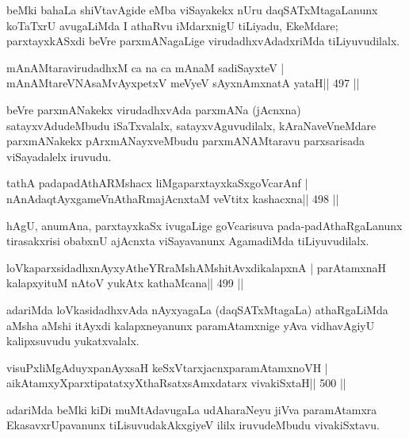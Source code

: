 \begin{artha}
beMki bahaLa shiVtavAgide eMba viSayakekx nUru daqSATxMtagaLanunx koTaTxrU avugaLiMda I athaRvu iMdarxnigU tiLiyadu, EkeMdare; parxtayxkASxdi beVre parxmANagaLige virudadhxvAdadxriMda tiLiyuvudilalx.
\end{artha}

\begin{shl}
mAnAMtaravirudadhxM ca na ca mAnaM sadiSayxteV |
mAnAMtareVNAsaMvAyxpetxV meVyeV sAyxnAmxnatA yataH\hfill || 497 ||
\end{shl}

\begin{artha}
beVre parxmANakekx virudadhxvAda parxmANa (jAcnxna) satayxvAdudeMbudu iSaTxvalalx, satayxvAguvudilalx, kAraNaveVneMdare parxmANakekx pArxmANayxveMbudu parxmANAMtaravu parxsarisada viSayadalelx iruvudu.
\end{artha}

\begin{shl}
tathA padapadAthARMshacx liMgaparxtayxkaSxgoVcarAnf |
nAnAdaqtAyx\s\s gameVnAthaRmajAcnxtaM veVtitx kashacxna\hfill || 498 ||
\end{shl}

\begin{artha}
hAgU, anumAna, parxtayxkaSx ivugaLige goVcarisuva pada-padAthaRgaLanunx tirasakxrisi obabxnU ajAcnxta viSayavanunx AgamadiMda tiLiyuvudilalx.
\end{artha}

\begin{shl}
loVkaparxsidadhxnAyxyAtheYRraMshAMshitAvxdikalapxnA |
parAtamxnaH kalapxyituM nAtoV yukAtx kathaMcana\hfill || 499 ||
\end{shl}

\begin{artha}
adariMda loVkasidadhxvAda nAyxyagaLa (daqSATxMtagaLa) athaRgaLiMda aMsha aMshi itAyxdi kalapxneyanunx paramAtamxnige yAva vidhavAgiyU kalipxsuvudu yukatxvalalx.
\end{artha}



\begin{shl}
visuPxliMgAduyxpanAyxsaH keSxVtarxjacnxparamAtamxnoVH |
aikAtamxyXparxtipatatxyXthaRsatxsAmxdatarx vivakiSxtaH\hfill || 500 ||
\end{shl}

\begin{artha}
adariMda beMki kiDi muMtAdavugaLa udAharaNeyu jiVva paramAtamxra EkasavxrUpavanunx tiLisuvudakAkxgiyeV ililx iruvudeMbudu vivakiSxtavu.
\end{artha}

